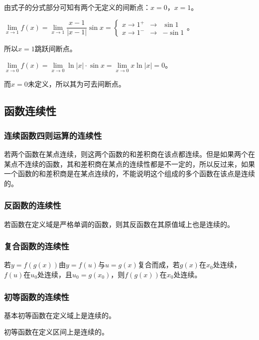 \documentclass[UTF8, 12pt]{ctexart}
\begin{document}
由式子的分式部分可知有两个无定义的间断点：$x=0$，$x=1$。\medskip

$\lim\limits_{x\to 1}f(x)=\lim\limits_{x\to 1}\dfrac{x-1}{\vert x-1\vert}\sin x=\left\{
    \begin{array}{lcl}
        x\to 1^+ & \rightarrow & \sin 1 \\
        x\to 1^- & \rightarrow & -\sin 1
    \end{array} \right.
$。

所以$x=1$跳跃间断点。

$\lim\limits_{x\to 0}f(x)=\lim\limits_{x\to 0}\ln\vert x\vert\cdot\sin x=\lim\limits_{x\to 0}x\ln\vert x\vert=0$。

而$x=0$未定义，所以其为可去间断点。

\subsection{函数连续性}

\subsubsection{连续函数四则运算的连续性}

若两个函数在某点连续，则这两个函数的和差积商在该点都连续。但是如果两个在某点不连续的函数，其和差积商在某点的连续性都是不一定的，所以反过来，如果一个函数的和差积商是在某点连续的，不能说明这个组成的多个函数在该点是连续的。

\subsubsection{反函数的连续性}

若函数在定义域是严格单调的函数，则其反函数在其原值域上也是连续的。

\subsubsection{复合函数的连续性}

若$y=f(g(x))$由$y=f(u)$与$u=g(x)$复合而成，若$g(x)$在$x_0$处连续，$f(u)$在$u_0$处连续，且$u_0=g(x_0)$，则$f(g(x))$在$x_0$处连续。

\subsubsection{初等函数的连续性}

基本初等函数在定义域上是连续的。

初等函数在定义区间上是连续的。
\end{document}
